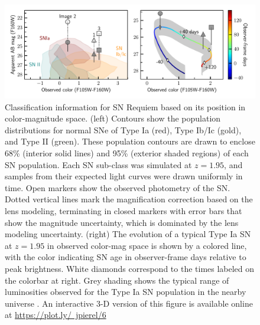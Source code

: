 \documentclass[12pt,dvipsnames]{article}
\begin{document}
\begin{figure}[h]
    \centering
    \includegraphics[draft=False, width=\textwidth]{Paper/Figures/classification_contours_timeline.pdf}
    \caption{Classification information for SN Requiem based on its position in color-magnitude space. (left) Contours show the population distributions for normal SNe of Type Ia (red), Type Ib/Ic (gold), and Type II (green).  These population contours are drawn to enclose 68\% (interior solid lines) and 95\% (exterior shaded regions) of each SN population.  Each SN sub-class was simulated at $z=1.95$, and samples from their expected light curves were drawn uniformly in time. Open markers show the observed photometry of the SN. Dotted vertical lines mark the magnification correction based on the lens modeling, terminating in closed markers with error bars that show the magnitude uncertainty, which is dominated by the lens modeling uncertainty.  (right) The evolution of a typical Type Ia SN at $z=1.95$ in observed color-mag space is shown by a colored line, with the color indicating SN age in observer-frame days relative to peak brightness.  White diamonds correspond to the times labeled on the colorbar at right. Grey shading shows the typical range of luminosities observed for the Type Ia SN population in the nearby universe \cite{wang_determination_2006}. An interactive 3-D version of this figure is available online at \href{https://plot.ly/~jpierel/6}{https://plot.ly/~jpierel/6}
    \label{fig:class}
    }
\end{figure}
\end{document}
